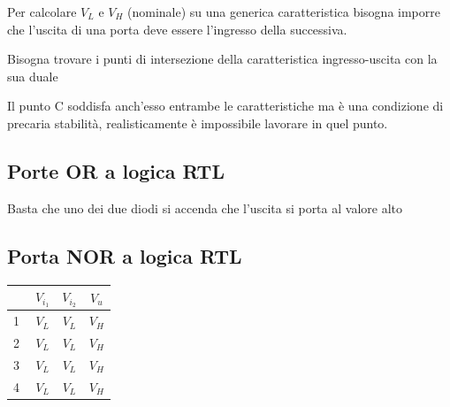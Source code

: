 \documentclass{article}
\begin{document}
Per calcolare $V_L$ e $V_H$ (nominale) su una generica caratteristica bisogna imporre che l'uscita di una porta deve essere l'ingresso della successiva.

Bisogna trovare i punti di intersezione della caratteristica ingresso-uscita con la sua duale

Il punto C soddisfa anch'esso entrambe le caratteristiche ma è una condizione di precaria stabilità, realisticamente è impossibile lavorare in quel punto.

\subsection{Porte OR a logica RTL}

Basta che uno dei due diodi si accenda che l'uscita si porta al valore alto

\subsection{Porta NOR a logica RTL}
\begin{minipage}{0.6\textwidth}
\end{minipage}
\begin{minipage}{0.4\textwidth}
\begin{tabular}{cc|c|c}
    &$V_{i_1}$ & $V_{i_2}$ & $V_u$\\
    \hline
    \textcircled{1} &$V_L$ & $V_L$ & $V_H$\\
    \textcircled{2} &$V_L$ & $V_L$ & $V_H$\\
    \textcircled{3} &$V_L$ & $V_L$ & $V_H$\\
    \textcircled{4} &$V_L$ & $V_L$ & $V_H$\\
\end{tabular}
\end{minipage}
\end{document}
